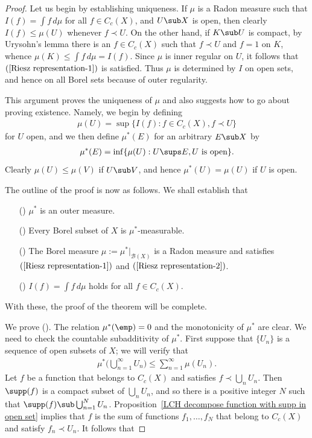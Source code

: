 \begin{proof}
Let us begin by establishing uniqueness. If $\mu$ is a Radon measure such that $I(f)=\int f\,d\mu$ for all $f\in C_c(X)$, and $U\sub X$ is open, then clearly $I(f)\leq\mu(U)$ whenever $f\prec U$. On the other hand, if $K\sub U$ is compact, by Urysohn's lemma there is an $f\in C_c(X)$ such that $f\prec U$ and $f=1$ on $K$, whence $\mu(K)\leq\int f\,d\mu=I(f)$. Since $\mu$ is inner regular on $U$, it follows that $(\ref{Riesz representation-1})$ is satisfied. Thus $\mu$ is determined by $I$ on open sets, and hence on all Borel sets because of outer regularity.\par
This argument proves the uniqueness of $\mu$ and also suggests how to go about proving existence. Namely, we begin by defining
\begin{align}\label{Riesz representation-3}
\mu(U)=\sup\{I(f):f\in C_c(X),f\prec U\}
\end{align}
for $U$ open, and we then define $\mu^*(E)$ for an arbitrary $E\sub X$ by
\begin{align}\label{Riesz representation-4}
\mu^*(E)=\inf\{\mu(U):U\sups E,\text{$U$ is open}\}.
\end{align}
Clearly $\mu(U)\leq\mu(V)$ if $U\sub V$, and hence $\mu^*(U)=\mu(U)$ if $U$ is open.\par
The outline of the proof is now as follows. We shall establish that
\begin{itemize}
\item[(\rmnum{1})] $\mu^*$ is an outer measure.
\item[(\rmnum{2})] Every Borel subset of $X$ is $\mu^*$-measurable.
\item[(\rmnum{3})] The Borel measure $\mu:=\mu^*|_{\mathcal{B}(X)}$ is a Radon measure and satisfies $(\ref{Riesz representation-1})$ and $(\ref{Riesz representation-2})$.
\item[(\rmnum{4})] $I(f)=\int f\,d\mu$ holds for all $f\in C_c(X)$.
\end{itemize}
With these, the proof of the theorem will be complete.\par
We prove (). The relation $\mu^*(\emp)=0$ and the monotonicity of $\mu^*$ are clear. We need to check the countable subadditivity of $\mu^*$. First suppose that $\{U_n\}$ is a sequence of open subsets of $X$; we will verify that
\begin{align}\label{Riesz representation-5}
\mu^*\Big(\bigcup_{n=1}^{\infty}U_n\Big)\leq\sum_{n=1}^{\infty}\mu(U_n).
\end{align}
Let $f$ be a function that belongs to $C_c(X)$ and satisfies $f\prec\bigcup_nU_n$. Then $\supp(f)$ is a compact subset of $\bigcup_nU_n$, and so there is a positive integer $N$ such that $\supp(f)\sub\bigcup_{n=1}^{N}U_n$. Proposition~\ref{LCH decompose function with supp in open set} implies that $f$ is the sum of functions $f_1,\dots,f_N$ that belong to $C_c(X)$ and satisfy $f_n\prec U_n$. It follows that

\end{proof}
